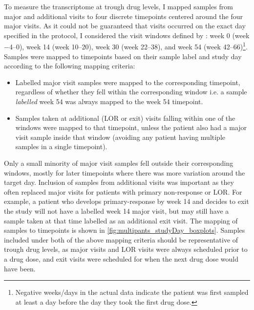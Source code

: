 To measure the transcriptome at trough drug levels, I mapped samples from major and additional visits to four discrete timepoints centered around the four major visits.
As it could not be guaranteed that visits occurred on the exact day specified in the protocol, I considered the visit windows defined by \textcite{kennedy2019PredictorsAntiTNFTreatment}: week 0 (week \numrange{-4}{0}), week 14 (week \numrange{10}{20}), week 30 (week \numrange{22}{38}), and week 54 (week \numrange{42}{66})\footnote{Negative weeks/days in the actual data indicate the patient was first sampled at least a day before the day they took the first drug dose.}.
Samples were mapped to timepoints based on their sample label and study day according to the following mapping criteria:
\begin{itemize}
    \item Labelled major visit samples were mapped to the corresponding timepoint, regardless of whether they fell within the corresponding window i.e. a sample \emph{labelled} week 54 was always mapped to the week 54 timepoint.
    \item Samples taken at additional (\gls{LOR} or exit) visits falling within one of the windows were mapped to that timepoint, unless the patient also had a major visit sample inside that window (avoiding any patient having multiple samples in a single timepoint).
\end{itemize}
Only a small minority of major visit samples fell outside their corresponding windows, mostly for later timepoints where there was more variation around the target day.
Inclusion of samples from additional visits was important as they often replaced major visits for patients with primary non-response or \gls{LOR}.
For example, a patient who develops primary-response by week 14 and decides to exit the study will not have a labelled week 14 major visit, but may still have a sample taken at that time labelled as an additional exit visit.
The mapping of samples to timepoints is shown in \cref{fig:multipants_studyDay_boxplots}.
Samples included under both of the above mapping criteria should be representative of trough drug levels,
as major visits and \gls{LOR} visits were always scheduled prior to a drug dose,
and exit visits were scheduled for when the next drug dose would have been.

